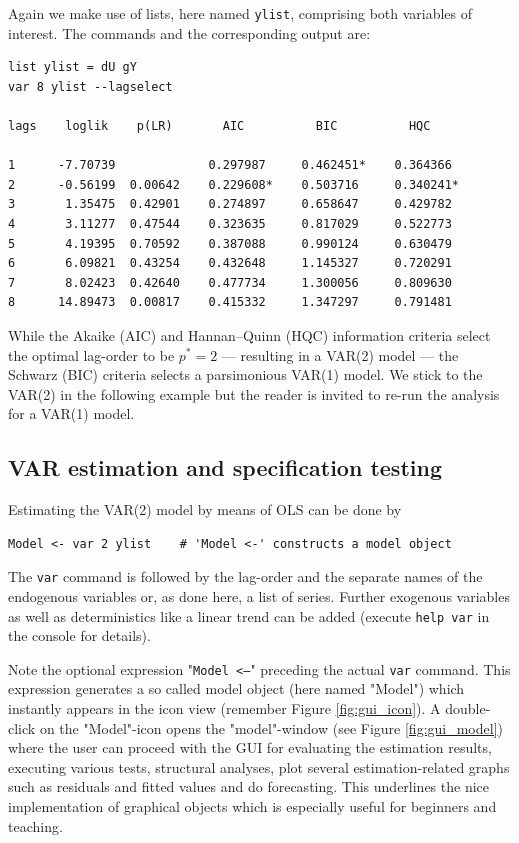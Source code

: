 \documentclass[11pt]{article}
\begin{document}
Again we make use of lists, here named \texttt{ylist}, comprising both variables of interest. The commands and the corresponding output are:
\begin{Verbatim}[baselinestretch=0.75, fontsize=\small]
list ylist = dU gY
var 8 ylist --lagselect

lags    loglik    p(LR)       AIC          BIC          HQC

1      -7.70739             0.297987     0.462451*    0.364366 
2      -0.56199  0.00642    0.229608*    0.503716     0.340241*
3       1.35475  0.42901    0.274897     0.658647     0.429782 
4       3.11277  0.47544    0.323635     0.817029     0.522773 
5       4.19395  0.70592    0.387088     0.990124     0.630479 
6       6.09821  0.43254    0.432648     1.145327     0.720291 
7       8.02423  0.42640    0.477734     1.300056     0.809630 
8      14.89473  0.00817    0.415332     1.347297     0.791481 
\end{Verbatim}
While the Akaike (AIC) and Hannan–Quinn (HQC) information criteria select the optimal lag-order to be $ p^\ast = 2 $ --- resulting in a VAR(2) model --- the Schwarz (BIC) criteria selects a parsimonious VAR(1) model. We stick to the VAR(2) in the following example but the reader is invited to re-run the analysis for a VAR(1) model.

\subsection{VAR estimation and specification testing}
Estimating the VAR(2) model by means of OLS can be done by
\begin{Verbatim}[baselinestretch=0.75, fontsize=\small]
Model <- var 2 ylist	# 'Model <-' constructs a model object
\end{Verbatim}
The \texttt{var} command is followed by the lag-order and the separate names of the endogenous variables or, as done here, a list of series. Further exogenous variables as well as deterministics like a linear trend can be added (execute \texttt{help var} in the console for details).

Note the optional expression "\texttt{Model <--}" preceding the actual \texttt{var} command. This expression generates a so called model object (here named "Model") which instantly appears in the icon view (remember Figure \ref{fig:gui_icon}). A double-click on the "Model"-icon opens the "model"-window (see Figure \ref{fig:gui_model}) where the user can proceed with the GUI for evaluating the estimation results, executing various tests, structural analyses, plot several estimation-related graphs such as residuals and fitted values and do forecasting. This underlines the nice implementation of graphical objects which is especially useful for beginners and teaching.
\end{document}
